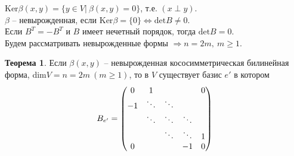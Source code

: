 \documentclass[a4paper, 12pt]{article}
\theoremstyle{definition}
\newtheorem*{theorem}{Теорема}
\begin{document}
        $\text{Ker}\beta(x,y) = \{y \in V|\ \beta(x,y) = 0\}$, т.е. $(x \perp y)$.\\
        $\beta$ -- невырожденная, если $\text{Ker} \beta = \{0\} \Longleftrightarrow \text{det}B \neq 0$.\\
        Если $B^T = - B^T$ и $B$ имеет нечетный порядок, тогда $\text{det}B = 0$.\\
        Будем рассматривать невырожденные формы $\Longrightarrow n = 2m,\ m \geq 1$. 
        \begin{theorem}
            Если $\beta(x,y)$ -- невырожденная кососимметрическая билинейная форма, dim$V = n = 2m\ (m \geq 1)$, то в $V$ существует базис $e'$ в котором
            $$B_{e'} = \begin{pmatrix}
                0 & 1 & \null & \null & 0\\
                -1 & \ddots & \ddots & \null & \null\\
                \null & \ddots & \ddots & \ddots & \null\\
                \null & \null & \ddots & \ddots & 1\\
                0 & \null & \null & -1 & 0
            \end{pmatrix}$$
        \end{theorem}
\end{document}

